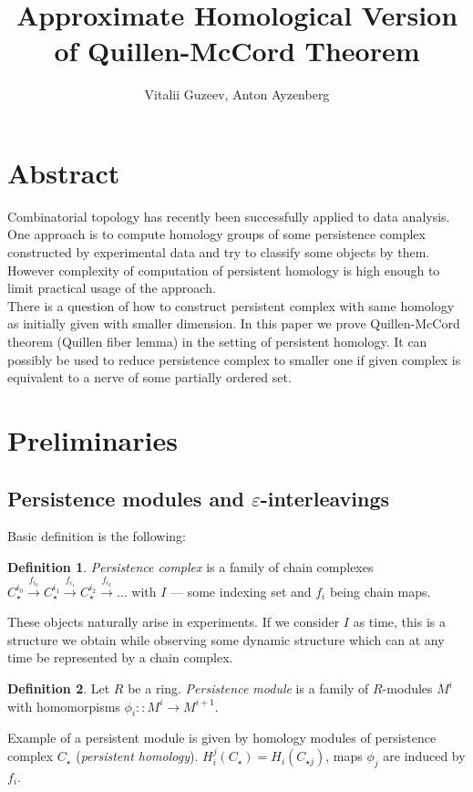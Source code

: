 \documentclass[a4paper, 12pt]{article}
\title{Approximate Homological Version of Quillen-McCord Theorem}
\author{Vitalii Guzeev, Anton Ayzenberg}
\theoremstyle{definition}
\newtheorem{definition}{Definition}
\theoremstyle{remark}
\newcommand{\define}[1]{{\textit{#1}}}
\begin{document}
\section{Abstract}

Combinatorial topology has recently been successfully applied to data analysis. One approach is to compute homology groups of some persistence complex constructed by experimental data and try to classify some objects by them. However complexity of computation of persistent homology is high enough to limit practical usage of the approach.\\

There is a question of how to construct persistent complex with same homology as initially given with smaller dimension. In this paper we prove Quillen-McCord theorem (Quillen fiber lemma) in the setting of persistent homology. It can possibly be used to reduce persistence complex to smaller one if given complex is equivalent to a nerve of some partially ordered set.

\section{Preliminaries}

\subsection{Persistence modules and $\varepsilon$-interleavings}

Basic definition is the following:

\begin{definition}
  \define{Persistence complex} is a family of chain complexes $C_{\star}^{i_0} \xrightarrow{f_{i_0}} C_{\star}^{i_1} \xrightarrow{f_{i_1}} C_{\star}^{i_2} \xrightarrow{f_{i_2}} \ldots$ with $I$ --- some indexing set and $f_i$ being chain maps.
\end{definition}

These objects naturally arise in experiments. If we consider $I$ as time, this is a structure we obtain while observing some dynamic structure which can at any time be represented by a chain complex.\\

\begin{definition}
  Let $R$ be a ring. \define{Persistence module} is a family of $R$-modules $M^i$ with homomorpisms $\phi_i :: M^i \to M^{i+1}$.
\end{definition}

Example of a persistent module is given by homology modules of persistence complex $C_{\star}$ (\define{persistent homology}). $H_i^j(C_{\star}) = H_i(C_{\star{j}})$, maps $\phi_j$ are induced by $f_i$.\\
\end{document}
